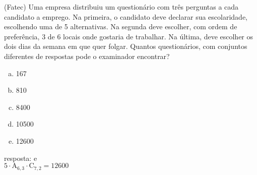 \begin{ex}
 (Fatec) Uma empresa distribuiu um questionário com três perguntas a cada candidato a emprego. Na primeira, o candidato deve declarar sua escolaridade, escolhendo uma de 5 alternativas. Na segunda deve escolher, com ordem de preferência, 3 de 6 locais onde gostaria de trabalhar. Na última, deve escolher os dois dias da semana em que quer folgar. Quantos questionários, com conjuntos diferentes de respostas pode o examinador encontrar?
    \begin{enumerate}[(a)]
    \item 167
    \item 810
    \item 8400
    \item 10500
    \item 12600
    \end{enumerate}
      \begin{sol}
       resposta: e \\
       $5\cdot\mathrm{A}_{6,3}\cdot\mathrm{C}_{7,2}=12600$
      \end{sol}
\end{ex}